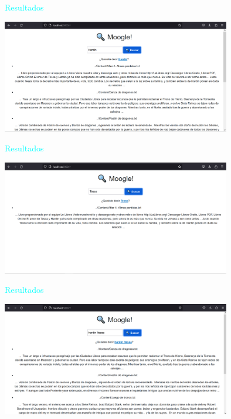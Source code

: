 \documentclass[a4paper, 12pt]{beamer}
\begin{document}
\begin{frame}{\textcolor{cyan}{Resultados}}
    \begin{center}
        \includegraphics[width=10cm]{images/image 2.png}
      \end{center}
    
\end{frame}

\begin{frame}{\textcolor{cyan}{Resultados}}
    \begin{center}
        \includegraphics[width=10cm]{images/image 3.png}
      \end{center}
    
\end{frame}

\begin{frame}{\textcolor{cyan}{Resultados}}
    \begin{center}
        \includegraphics[width=10cm]{images/image 4.png}
      \end{center}
    
\end{frame}
\end{document}
